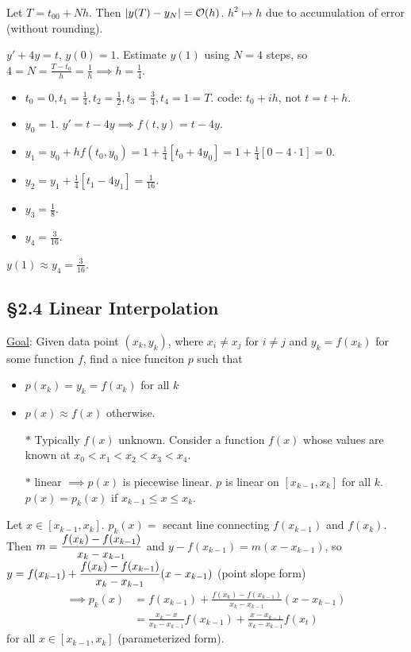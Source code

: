 \documentclass[]{article}
\begin{document}
\begin{fact}
	Let $T=t_00+Nh$. Then $|y(T)-y_N|=\mathcal{O}(h)$. $h^2\mapsto h$ due to accumulation of error (without rounding).
\end{fact}
\begin{example}
	$y'+4y=t$, $y(0)=1$.
	Estimate $y(1)$ using $N=4$ steps, so $4=N=\frac{T-t_0}h = \frac1h\implies h=\frac14$.
	\begin{itemize}
		\item $t_0=0,t_1=\frac14,t_2=\frac12,t_3=\frac34,t_4=1=T$. code: $t_0+ih$, not $t=t+h$.
		\item $y_0=1$. $y' = t-4y \implies f(t,y) = t-4y$.
		\item $y_1 = y_0 + hf(t_0,y_0) = 1+\frac14[t_0+4y_0] = 1+\frac14[0-4\cdot1] = 0$.
		\item $y_2 = y_1 + \frac14[t_1-4y_1] = \frac1{16}$.
		\item $y_3 = \frac18$.
		\item $y_4 = \frac3{16}$.
	\end{itemize}
	$y(1) \approx y_4 = \frac3{16}$.
\end{example}

\subsection*{\S2.4 Linear Interpolation}

\ul{Goal}: Given data point $(x_k,y_k)$, where $x_i\neq x_j$ for $i\neq j$ and $y_k=f(x_k)$ for some function $f$, find a nice funciton $p$ such that
\begin{itemize}
	\item $p(x_k)=y_k=f(x_k)$ for all $k$
	\item $p(x) \approx f(x)$ otherwise.
\end{itemize}
\begin{enumerate}
	\item[$*$] Typically $f(x)$ unknown.
		Consider a function $f(x)$ whose values are known at $x_0<x_1<x_2<x_3<x_4$.

	\item[$*$] linear $\implies p(x)$ is piecewise linear. $p$ is linear on $[x_{k-1},x_k]$ for all $k$. $p(x) = p_k(x)$ if $x_{k-1}\leq x\leq x_k$.
\end{enumerate}

Let $x\in [x_{k-1},x_k]$. $p_k(x) = $ secant line connecting $f(x_{k-1})$ and $f(x_k)$.
Then $\displaystyle m = \frac{f(x_k)-f(x_{k-1})}{x_k-x_{k-1}}$ and $y-f(x_{k-1}) = m (x-x_{k-1})$, so $\displaystyle y = f(x_{k-1}) + \frac{f(x_k)-f(x_{k-1})}{x_k-x_{k-1}}(x-x_{k-1})$
(point slope form)
\begin{align*}
	\implies p_k(x) &= f(x_{k-1}) + \frac{f(x_k)-f(x_{k-1})}{x_k-x_{k-1}}(x-x_{k-1}) \\
					&= \frac{x_k-x}{x_k-x_{k-1}}f(x_{k-1}) + \frac{x-x_{k-1}}{x_k-x_{k-1}}f(x_t)
\end{align*}
for all $x\in[x_{k-1},x_k]$
(parameterized form).
\end{document}
